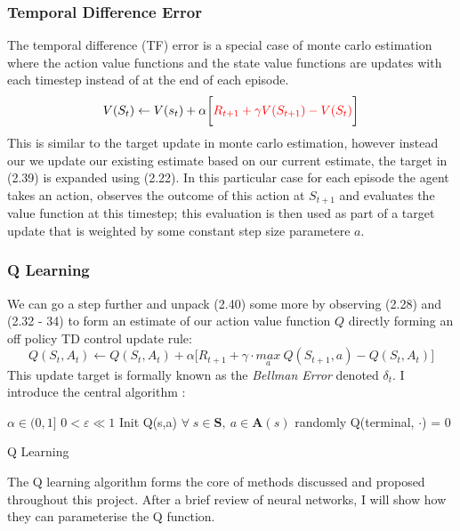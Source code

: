 \subsubsection{Temporal Difference Error}
The temporal difference (TF) error is a special case of monte carlo estimation where the action
value functions and the state value functions are updates with each timestep instead of at the end of each episode.
\begin{equation}
    V(S_t) \leftarrow V(s_t) + \alpha \biggl[\textcolor{red}{R_{t+1} + \gamma V(S_{t+1}) - V(S_t)} \biggl]
\end{equation}
This is similar to the target update in monte carlo estimation, however instead our we update
our existing estimate based on our current estimate, the target in (2.39) is expanded using (2.22).
In this particular case for each episode the agent takes an action, observes the outcome of this action at $S_{t+1}$
and evaluates the value function at this timestep; this evaluation is then used as part of a target update
that is weighted by some constant step size parametere $a$.
\subsubsection{Q Learning}
We can go a step further and unpack (2.40) some more by observing (2.28) and (2.32 - 34) to
form an estimate of our action value function $Q$ directly forming an off policy TD control update rule:
\begin{equation}
    Q(S_t,A_t) \leftarrow Q(S_t,A_t) + \alpha \biggl [R_{t+1} + \gamma \cdot \underset{a}{max} \: Q(S_{t+1}, a) - Q(S_t,A_t) \biggl ]
\end{equation}
This update target is formally known as the \emph{Bellman Error} denoted $\delta_t$. I introduce 
the central algorithm \cite{sutton2018reinforcement}:
\begin{algorithm}[!htb]
    \SetAlgoLined
     $\alpha \in (0,1]$\;
     $0 < \varepsilon \ll 1$\;
     Init Q(s,a) $\forall \; s \in \mathbf{S}, \: a \in \mathbf{A}(s)$ randomly\;
     Q(terminal, $\cdot$) = 0\;
     \caption{Q Learning }
\end{algorithm}
The Q learning algorithm forms the core of methods discussed and proposed throughout this project.
After a brief review of neural networks, I will show how they can parameterise the Q function.
